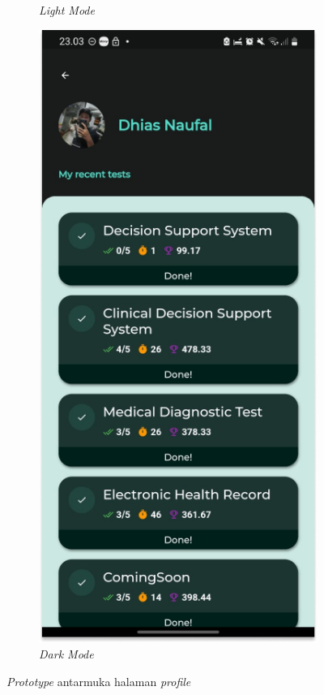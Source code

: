 \begin{figure}[H]
\begin{subfigure}[b]{0.23\textwidth}
	  \caption{\textit{Light Mode}}
	  \label{fig:HasilQuizprofil}
	\end{subfigure}
	\begin{subfigure}[b]{0.23\textwidth}
		\centering
	  \includegraphics[width=\linewidth]{contents/chapter-3/images/HF-profil-dt.png}
	  \caption{\textit{Dark Mode}}
	  \label{fig:HasilQuizprofil2}
	\end{subfigure}
	\caption{\textit{Prototype} antarmuka halaman \textit{profile}}
	\label{Fig:HasilFeatureSetProfil}
\end{figure}
